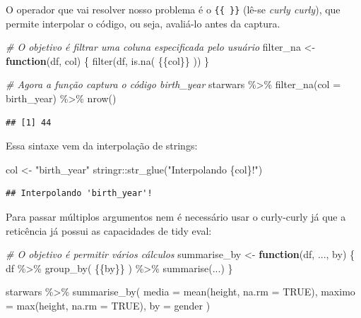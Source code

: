 \documentclass[
]{book}
\newenvironment{Shaded}{\begin{snugshade}}{\end{snugshade}}
\newcommand{\AttributeTok}[1]{\textcolor[rgb]{0.77,0.63,0.00}{#1}}
\newcommand{\CommentTok}[1]{\textcolor[rgb]{0.56,0.35,0.01}{\textit{#1}}}
\newcommand{\ConstantTok}[1]{\textcolor[rgb]{0.00,0.00,0.00}{#1}}
\newcommand{\ControlFlowTok}[1]{\textcolor[rgb]{0.13,0.29,0.53}{\textbf{#1}}}
\newcommand{\FunctionTok}[1]{\textcolor[rgb]{0.00,0.00,0.00}{#1}}
\newcommand{\NormalTok}[1]{#1}
\newcommand{\OtherTok}[1]{\textcolor[rgb]{0.56,0.35,0.01}{#1}}
\newcommand{\SpecialCharTok}[1]{\textcolor[rgb]{0.00,0.00,0.00}{#1}}
\newcommand{\StringTok}[1]{\textcolor[rgb]{0.31,0.60,0.02}{#1}}
\begin{document}
O operador que vai resolver nosso problema é o \texttt{\{\{\ \}\}} (lê-se \emph{curly curly}), que permite interpolar o código, ou seja, avaliá-lo antes da captura.

\begin{Shaded}
\begin{Highlighting}[]
\CommentTok{\# O objetivo é filtrar uma coluna especificada pelo usuário}
\NormalTok{filter\_na }\OtherTok{\textless{}{-}} \ControlFlowTok{function}\NormalTok{(df, col) \{}
  \FunctionTok{filter}\NormalTok{(df, }\FunctionTok{is.na}\NormalTok{( \{\{col\}\} ))}
\NormalTok{\}}

\CommentTok{\# Agora a função captura o código \textquotesingle{}birth\_year\textquotesingle{}}
\NormalTok{starwars }\SpecialCharTok{\%\textgreater{}\%} \FunctionTok{filter\_na}\NormalTok{(}\AttributeTok{col =}\NormalTok{ birth\_year) }\SpecialCharTok{\%\textgreater{}\%} \FunctionTok{nrow}\NormalTok{()}
\end{Highlighting}
\end{Shaded}

\begin{verbatim}
## [1] 44
\end{verbatim}

Essa sintaxe vem da interpolação de strings:

\begin{Shaded}
\begin{Highlighting}[]
\NormalTok{col }\OtherTok{\textless{}{-}} \StringTok{"birth\_year"}
\NormalTok{stringr}\SpecialCharTok{::}\FunctionTok{str\_glue}\NormalTok{(}\StringTok{"Interpolando \textquotesingle{}\{col\}\textquotesingle{}!"}\NormalTok{)}
\end{Highlighting}
\end{Shaded}

\begin{verbatim}
## Interpolando 'birth_year'!
\end{verbatim}

Para passar múltiplos argumentos nem é necessário usar o curly-curly já que a reticência já possui as capacidades de tidy eval:

\begin{Shaded}
\begin{Highlighting}[]
\CommentTok{\# O objetivo é permitir vários cálculos}
\NormalTok{summarise\_by }\OtherTok{\textless{}{-}} \ControlFlowTok{function}\NormalTok{(df, ..., by) \{}
\NormalTok{  df }\SpecialCharTok{\%\textgreater{}\%}
    \FunctionTok{group\_by}\NormalTok{( \{\{by\}\} ) }\SpecialCharTok{\%\textgreater{}\%}
    \FunctionTok{summarise}\NormalTok{(...)}
\NormalTok{\}}
  
\NormalTok{starwars }\SpecialCharTok{\%\textgreater{}\%}
  \FunctionTok{summarise\_by}\NormalTok{(}
    \AttributeTok{media =} \FunctionTok{mean}\NormalTok{(height, }\AttributeTok{na.rm =} \ConstantTok{TRUE}\NormalTok{),}
    \AttributeTok{maximo =} \FunctionTok{max}\NormalTok{(height, }\AttributeTok{na.rm =} \ConstantTok{TRUE}\NormalTok{),}
    \AttributeTok{by =}\NormalTok{ gender}
\NormalTok{  )}
\end{Highlighting}
\end{Shaded}
\end{document}
